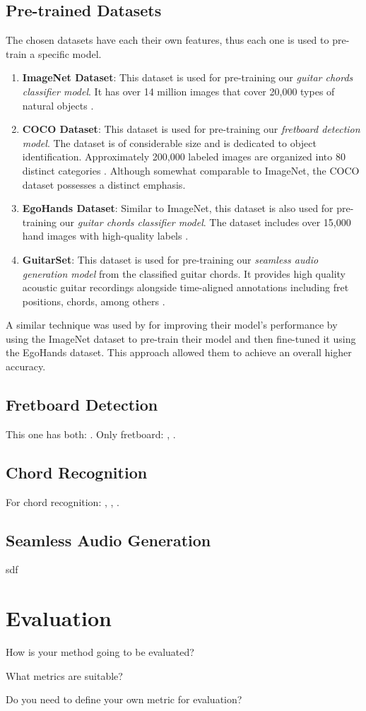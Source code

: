 \documentclass[10pt,twocolumn,letterpaper]{article}
\begin{document}
\subsection{Pre-trained Datasets}
The chosen datasets have each their own features, thus each one is used to pre-train a specific model.

\begin{enumerate}[label=\arabic*)]
    \item \textbf{ImageNet Dataset}: This dataset is used for pre-training our \emph{guitar chords classifier model}. It has over 14 million images that cover 20,000 types of natural objects \cite{russakovsky2015imagenetlargescalevisual}.
    \item \textbf{COCO Dataset}: This dataset is used for pre-training our \emph{fretboard detection model}. The dataset is of considerable size and is dedicated to object identification. Approximately 200,000 labeled images are organized into 80 distinct categories \cite{lin2015microsoftcococommonobjects}. Although somewhat comparable to ImageNet, the COCO dataset possesses a distinct emphasis.
    \item \textbf{EgoHands Dataset}: Similar to ImageNet, this dataset is also used for pre-training our \emph{guitar chords classifier model}. The dataset includes over 15,000 hand images with high-quality labels \cite{Bambach_2015_ICCV}.
    \item \textbf{GuitarSet}: This dataset is used for pre-training our \emph{seamless audio generation model} from the classified guitar chords. It provides high quality acoustic guitar recordings alongside time-aligned annotations including fret positions, chords, among others \cite{Xi2018}.
\end{enumerate}

A similar technique was used by \cite{Jadhav_transferlearning} for improving their model's performance by using the ImageNet dataset to pre-train their model and then fine-tuned it using the EgoHands dataset. This approach allowed them to achieve an overall higher accuracy.

\subsection{Fretboard Detection}
This one has both: \cite{guitar-chords-daewp_dataset}. 
Only fretboard: \cite{guitar-ppfil_dataset}, \cite{done-npcll_dataset}.

\subsection{Chord Recognition}
For chord recognition: \cite{guitar-chord-tvon8_dataset}, \cite{guitar-chord-bounding-box_dataset}, \cite{guitar-chord-handshape_dataset}.

\subsection{Seamless Audio Generation}
sdf

\section{Evaluation}

How is your method going to be evaluated?

What metrics are suitable?

Do you need to define your own metric for evaluation?

{\small


}
\end{document}
